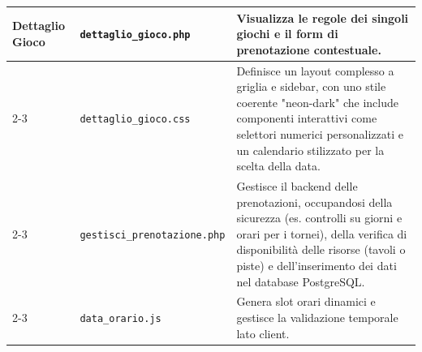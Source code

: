 \documentclass[a4paper, twoside]{report}
\begin{document}
\begin{tabularx}{\textwidth}{|l|X|X|}
\cellcolor{yellow!50!white} \textbf{Dettaglio Gioco} & \texttt{dettaglio\_gioco.php} & Visualizza le regole dei singoli giochi e il form di prenotazione contestuale. \\ \cline{2-3}
\cellcolor{yellow!50!white} & \texttt{dettaglio\_gioco.css} & Definisce un layout complesso a griglia e sidebar, con uno stile coerente "neon-dark" che include componenti interattivi come selettori numerici personalizzati e un calendario stilizzato per la scelta della data. \\ \cline{2-3}
\cellcolor{yellow!50!white} & \texttt{gestisci\_prenotazione.php} & Gestisce il backend delle prenotazioni, occupandosi della sicurezza (es. controlli su giorni e orari per i tornei), della verifica di disponibilità delle risorse (tavoli o piste) e dell'inserimento dei dati nel database PostgreSQL. \\ \cline{2-3}
\cellcolor{yellow!50!white} & \texttt{data\_orario.js} & Genera slot orari dinamici e gestisce la validazione temporale lato client. \\ \hline
\end{tabularx}
\end{document}
